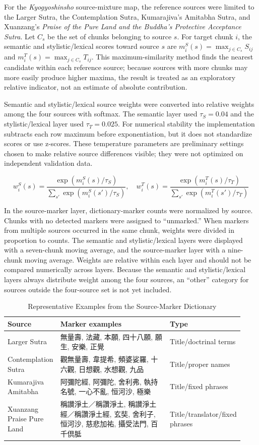 \documentclass[uplatex,dvipdfmx,11pt,a4paper]{jsarticle}
\begin{document}
For the \textit{Kyogyoshinsho} source-mixture map, the reference sources were limited to the Larger Sutra, the Contemplation Sutra, Kumarajiva's Amitabha Sutra, and Xuanzang's \textit{Praise of the Pure Land and the Buddha's Protective Acceptance Sutra}. Let $C_s$ be the set of chunks belonging to source $s$. For target chunk $i$, the semantic and stylistic/lexical scores toward source $s$ are $m_i^S(s)=\max_{j\in C_s} S_{ij}$ and $m_i^T(s)=\max_{j\in C_s} T_{ij}$. This maximum-similarity method finds the nearest candidate within each reference source; because sources with more chunks may more easily produce higher maxima, the result is treated as an exploratory relative indicator, not an estimate of absolute contribution.

Semantic and stylistic/lexical source weights were converted into relative weights among the four sources with softmax. The semantic layer used $\tau_S=0.04$ and the stylistic/lexical layer used $\tau_T=0.025$. For numerical stability the implementation subtracts each row maximum before exponentiation, but it does not standardize scores or use z-scores. These temperature parameters are preliminary settings chosen to make relative source differences visible; they were not optimized on independent validation data.

\[
w_i^S(s)=\frac{\exp(m_i^S(s)/\tau_S)}{\sum_{s'}\exp(m_i^S(s')/\tau_S)},\quad
w_i^T(s)=\frac{\exp(m_i^T(s)/\tau_T)}{\sum_{s'}\exp(m_i^T(s')/\tau_T)}
\]

In the source-marker layer, dictionary-marker counts were normalized by source. Chunks with no detected markers were assigned to ``unmarked.'' When markers from multiple sources occurred in the same chunk, weights were divided in proportion to counts. The semantic and stylistic/lexical layers were displayed with a seven-chunk moving average, and the source-marker layer with a nine-chunk moving average. Weights are relative within each layer and should not be compared numerically across layers. Because the semantic and stylistic/lexical layers always distribute weight among the four sources, an ``other'' category for sources outside the four-source set is not yet included.

\begin{table}[H]
\centering
\caption{Representative Examples from the Source-Marker Dictionary}
\label{tab:marker-dictionary}
\begin{tabular}{@{}p{0.20\linewidth}p{0.55\linewidth}p{0.18\linewidth}@{}}
\toprule
Source & Marker examples & Type \\
\midrule
Larger Sutra & 無量壽, 法藏, 本願, 四十八願, 願生, 安樂, 正覺 & Title/doctrinal terms \\
Contemplation Sutra & 觀無量壽, 韋提希, 頻婆娑羅, 十六觀, 日想觀, 水想觀, 九品 & Title/proper names \\
Kumarajiva Amitabha & 阿彌陀經, 阿彌陀, 舍利弗, 執持名號, 一心不亂, 恒河沙, 極樂 & Title/fixed phrases \\
Xuanzang Praise Pure Land & 稱讃淨土／稱讚淨土, 稱讃淨土經／稱讚淨土經, 玄奘, 舍利子, 恒河沙, 慈悲加祐, 攝受法門, 百千倶胝 & Title/translator/fixed phrases \\
\bottomrule
\end{tabular}
\end{table}
\end{document}
